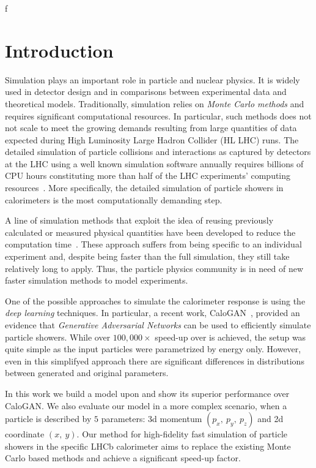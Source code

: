 f\section{Introduction}

Simulation plays an important role in particle and nuclear physics. It is widely used in detector design and in comparisons between experimental data and theoretical models. Traditionally, simulation relies on \textit{Monte Carlo methods} and requires significant computational resources. In particular, such methods does not not scale to meet the growing demands resulting from large quantities of data expected during High Luminosity Large Hadron Collider (HL LHC) runs. The detailed simulation of particle collisions and interactions as captured by detectors at the LHC using a well known simulation software \geant annually requires billions of CPU hours constituting more than half of the LHC experiments' computing resources~\cite{bozzi2014,flynn2015computing}. More specifically, the detailed simulation of particle showers in calorimeters is the most computationally demanding step.
 
A line of simulation methods that exploit the idea of reusing previously calculated or measured physical quantities have been developed to reduce the computation time~\cite{grindhammer2000parameterized,atlas2010simulation}. These approach suffers from being specific to an individual experiment and, despite being faster than the full simulation, they still take relatively long to apply. Thus, the particle physics community is in need of new faster simulation methods to model experiments. 
    
One of the possible approaches to simulate the calorimeter response is using the \textit{deep learning} techniques. In particular, a recent work, CaloGAN~\cite{paganini2017calogan}, provided an evidence that \textit{Generative Adversarial Networks} can be used to efficiently simulate particle showers. While over $100,000 \times$ speed-up over \geant is achieved, the setup was quite simple as the input particles were parametrized by energy only. However,  even in this simplifyed approach there are significant differences in distributions between generated and original parameters. 

In this work we build a model upon  and show its superior performance over CaloGAN. We also evaluate our model in a more complex scenario, when a particle is described by $5$ parameters: 3d momentum $(p_x,~ p_y,~ p_z)$ and 2d coordinate $(x,~ y)$. Our method for high-fidelity fast simulation of particle showers in the specific LHCb calorimeter aims to replace the existing Monte Carlo based methods and achieve a significant speed-up factor.
 



